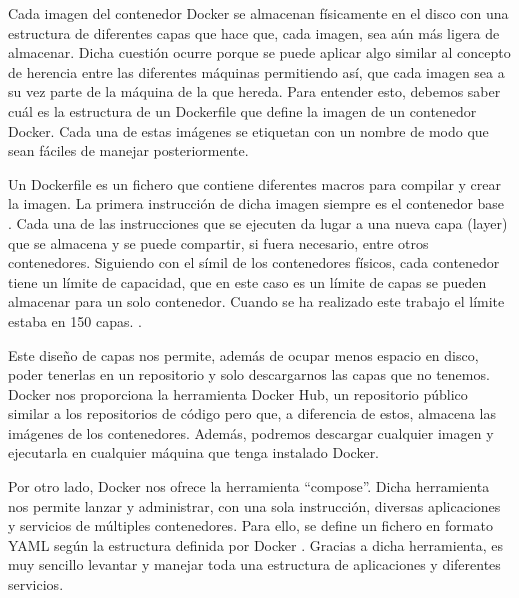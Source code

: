 Cada imagen del contenedor Docker se almacenan físicamente en el disco con una estructura de diferentes capas que hace que, cada imagen, sea aún más ligera de almacenar. Dicha cuestión ocurre porque se puede aplicar algo similar al concepto de herencia entre las diferentes máquinas permitiendo así, que cada imagen sea a su vez parte de la máquina de la que hereda. Para entender esto, debemos saber cuál es la estructura de un Dockerfile que define la imagen de un contenedor Docker. Cada una de estas imágenes se etiquetan con un nombre de modo que sean fáciles de manejar posteriormente.\par

Un Dockerfile es un fichero que contiene diferentes macros para compilar y crear la imagen. La primera instrucción de dicha imagen siempre es el contenedor base \cite{Dck-11}. Cada una de las instrucciones que se ejecuten da lugar a una nueva capa (layer) que se almacena y se puede compartir, si fuera necesario, entre otros contenedores. Siguiendo con el símil de los contenedores físicos, cada contenedor tiene un límite de capacidad, que en este caso es un límite de capas se pueden almacenar para un solo contenedor. Cuando se ha realizado este trabajo el límite estaba en 150 capas. \cite{Dck-12}. \par

Este diseño de capas nos permite, además de ocupar menos espacio en disco, poder tenerlas en un repositorio y solo descargarnos las capas que no tenemos. Docker nos proporciona la herramienta Docker Hub, un repositorio público similar a los repositorios de código pero que, a diferencia de estos, almacena las imágenes de los contenedores. Además, podremos descargar cualquier imagen y ejecutarla en cualquier máquina que tenga instalado Docker.\par

Por otro lado, Docker nos ofrece la herramienta “compose”. Dicha herramienta nos permite lanzar y administrar, con una sola instrucción, diversas aplicaciones y servicios de múltiples contenedores. Para ello, se define un fichero en formato YAML según la estructura definida por Docker \cite{Dck-13}. Gracias a dicha herramienta, es muy sencillo levantar y manejar toda una estructura de aplicaciones y diferentes servicios.\par

